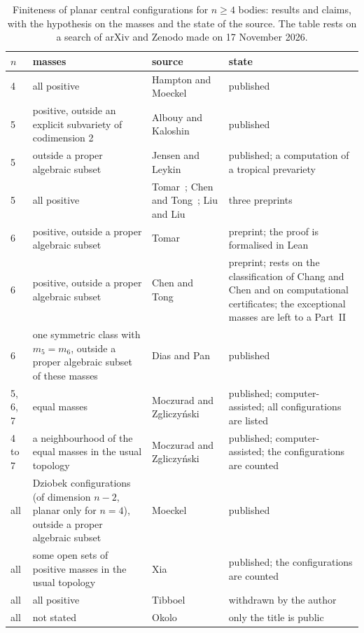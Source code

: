 \documentclass[11pt]{amsart}
\theoremstyle{definition}
\theoremstyle{remark}
\numberwithin{equation}{section}
\begin{document}
\begin{table}[ht]
\caption{Finiteness of planar central configurations for $n \ge 4$ bodies: results and claims, with the
hypothesis on the masses and the state of the source. The table rests on a search of arXiv and Zenodo
made on 17 November 2026.}\label{tab:known}
\small
\begin{tabular}{@{}l>{\raggedright}p{}>{\raggedright}p{}>{\raggedright\arraybackslash}p{}@{}}
\toprule
$n$ & masses & source & state \\
\midrule
4 & all positive & Hampton and Moeckel~\cite{hamptonmoeckel2006} & published \\
5 & positive, outside an explicit subvariety of codimension 2 & Albouy and Kaloshin~\cite{albouykaloshin2012} & published \\
5 & outside a proper algebraic subset & Jensen and Leykin~\cite{jensenleykin2025} & published; a computation of a tropical prevariety \\
5 & all positive & Tomar~\cite{tomar5}; Chen and Tong~\cite{chentong5}; Liu and Liu~\cite{liuliu5} & three preprints \\
6 & positive, outside a proper algebraic subset & Tomar~\cite{tomar6} & preprint; the proof is formalised in Lean \\
6 & positive, outside a proper algebraic subset & Chen and Tong~\cite{chentong6} & preprint; rests on the classification of Chang and Chen and on computational certificates; the exceptional masses are left to a Part~II \\
6 & one symmetric class with $m_5 = m_6$, outside a proper algebraic subset of these masses & Dias and Pan~\cite{diaspan2020} & published \\
5, 6, 7 & equal masses & Moczurad and Zgliczy\'nski~\cite{moczuradzgliczynski2019} & published; computer-assisted; all configurations are listed \\
4 to 7 & a neighbourhood of the equal masses in the usual topology & Moczurad and Zgliczy\'nski~\cite{moczuradzgliczynski2020} & published; computer-assisted; the configurations are counted \\
all & Dziobek configurations (of dimension $n - 2$, planar only for $n = 4$), outside a proper algebraic subset & Moeckel~\cite{moeckel2001} & published \\
all & some open sets of positive masses in the usual topology & Xia~\cite{xia1991} & published; the configurations are counted \\
all & all positive & Tibboel~\cite{tibboel2013} & withdrawn by the author \\
all & not stated & Okolo~\cite{okolo2026} & only the title is public \\
\bottomrule
\end{tabular}
\end{table}
\end{document}
